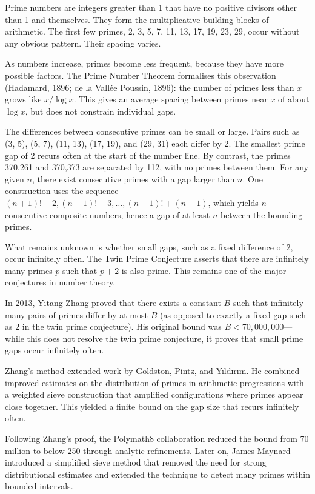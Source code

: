 Prime numbers are integers greater than 1 that have no positive divisors other than 1 and themselves. They form the multiplicative building blocks of arithmetic. The first few primes, 2, 3, 5, 7, 11, 13, 17, 19, 23, 29, occur without any obvious pattern. Their spacing varies.

As numbers increase, primes become less frequent, because they have more possible factors. The Prime Number Theorem formalises this observation (Hadamard, 1896; de la Vallée Poussin, 1896): the number of primes less than $x$ grows like $x / \log x$. This gives an average spacing between primes near $x$ of about $\log x$, but does not constrain individual gaps.

The differences between consecutive primes can be small or large. Pairs such as (3, 5), (5, 7), (11, 13), (17, 19), and (29, 31) each differ by 2. The smallest prime gap of 2 recurs often at the start of the number line. By contrast, the primes 370,261 and 370,373 are separated by 112, with no primes between them. For any given $n$, there exist consecutive primes with a gap larger than $n$. One construction uses the sequence $(n+1)! + 2,  (n+1)! + 3,  \dots,  (n+1)! + (n+1)$, which yields $n$ consecutive composite numbers, hence a gap of at least $n$ between the bounding primes.

What remains unknown is whether small gaps, such as a fixed difference of 2, occur infinitely often. The Twin Prime Conjecture asserts that there are infinitely many primes $p$ such that $p + 2$ is also prime. This remains one of the major conjectures in number theory.

In 2013, Yitang Zhang proved that there exists a constant $B$ such that infinitely many pairs of primes differ by at most $B$ (as opposed to exactly a fixed gap such as 2 in the twin prime conjecture). His original bound was $B < 70{,}000{,}000$—while this does not resolve the twin prime conjecture, it proves that small prime gaps occur infinitely often.

Zhang's method extended work by Goldston, Pintz, and Yıldırım. He combined improved estimates on the distribution of primes in arithmetic progressions with a weighted sieve construction that amplified configurations where primes appear close together. This yielded a finite bound on the gap size that recurs infinitely often.

Following Zhang's proof, the Polymath8 collaboration reduced the bound from 70 million to below 250 through analytic refinements. Later on, James Maynard introduced a simplified sieve method that removed the need for strong distributional estimates and extended the technique to detect many primes within bounded intervals.

